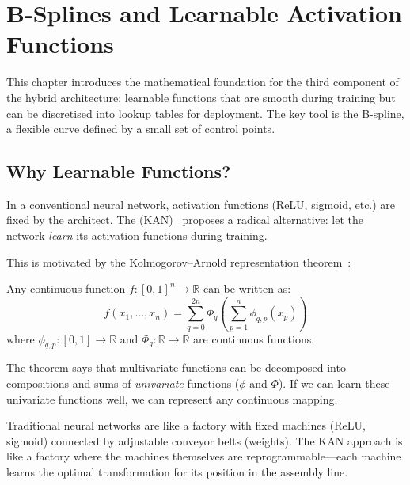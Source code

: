 \chapter{B-Splines and Learnable Activation Functions}
\label{ch:splines}

This chapter introduces the mathematical foundation for the third
component of the hybrid architecture: learnable functions that are
smooth during training but can be discretised into lookup tables for
deployment. The key tool is the B-spline, a flexible curve defined by
a small set of control points.


\section{Why Learnable Functions?}
\label{sec:why-learnable}

In a conventional neural network, activation functions (ReLU, sigmoid,
etc.) are fixed by the architect. The  (KAN)~\cite{liu2024kan} proposes a radical alternative: let
the network \emph{learn} its activation functions during training.

This is motivated by the Kolmogorov--Arnold representation theorem~\cite{kolmogorov1957representation}:

\begin{theorem}
\label{thm:ka}
Any continuous function $f : [0,1]^n \to \mathbb{R}$ can be written as:
\begin{equation}
  f(x_1, \ldots, x_n) = \sum_{q=0}^{2n} \Phi_q\!\left(
    \sum_{p=1}^{n} \phi_{q,p}(x_p)\right)
  \label{eq:ka-theorem}
\end{equation}
where $\phi_{q,p} : [0,1] \to \mathbb{R}$ and
$\Phi_q : \mathbb{R} \to \mathbb{R}$ are continuous functions.
\end{theorem}

The theorem says that multivariate functions can be decomposed into
compositions and sums of \emph{univariate} functions ($\phi$ and
$\Phi$). If we can learn these univariate functions well, we can
represent any continuous mapping.

\begin{analogy}
Traditional neural networks are like a factory with fixed machines
(ReLU, sigmoid) connected by adjustable conveyor belts (weights). The
KAN approach is like a factory where the machines themselves are
reprogrammable---each machine learns the optimal transformation for
its position in the assembly line.
\end{analogy}


